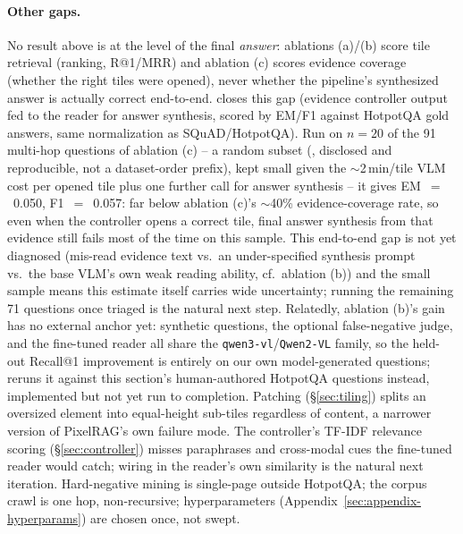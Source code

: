 \paragraph{Other gaps.} No result above is at the level of the final \emph{answer}: ablations (a)/(b) score tile retrieval (ranking, R@1/MRR) and ablation (c) scores evidence coverage (whether the right tiles were opened), never whether the pipeline's synthesized answer is actually correct end-to-end.  closes this gap (evidence controller output fed to the reader for answer synthesis, scored by EM/F1 against HotpotQA gold answers, same normalization as SQuAD/HotpotQA). Run on $n{=}20$ of the 91 multi-hop questions of ablation (c) -- a random subset (, disclosed and reproducible, not a dataset-order prefix), kept small given the $\sim$2\,min/tile VLM cost per opened tile plus one further call for answer synthesis -- it gives EM~$=$~0.050, F1~$=$~0.057: far below ablation (c)'s $\sim$40\% evidence-coverage rate, so even when the controller opens a correct tile, final answer synthesis from that evidence still fails most of the time on this sample. This end-to-end gap is not yet diagnosed (mis-read evidence text vs.\ an under-specified synthesis prompt vs.\ the base VLM's own weak reading ability, cf.\ ablation (b)) and the small sample means this estimate itself carries wide uncertainty; running the remaining 71 questions once triaged is the natural next step. Relatedly, ablation (b)'s gain has no external anchor yet: synthetic questions, the optional false-negative judge, and the fine-tuned reader all share the \texttt{qwen3-vl}/\texttt{Qwen2-VL} family, so the held-out Recall@1 improvement is entirely on our own model-generated questions;  reruns it against this section's human-authored HotpotQA questions instead, implemented but not yet run to completion. Patching (\S\ref{sec:tiling}) splits an oversized element into equal-height sub-tiles regardless of content, a narrower version of PixelRAG's own failure mode. The controller's TF-IDF relevance scoring (\S\ref{sec:controller}) misses paraphrases and cross-modal cues the fine-tuned reader would catch; wiring in the reader's own similarity is the natural next iteration. Hard-negative mining is single-page outside HotpotQA; the corpus crawl is one hop, non-recursive; hyperparameters (Appendix~\ref{sec:appendix-hyperparams}) are chosen once, not swept.
